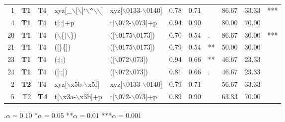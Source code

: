 \begin{table*}[ht]
\begin{tabular}{rr@{ -- }lllrrlrrl}
  1 & {\bf T1} & T4 & xyz[\_$\backslash$[$\backslash$]`$\backslash$\verb|^|$\backslash$$\backslash$] & xyz[$\backslash$0133-$\backslash$0140] & 0.78 & 0.71 &   & 86.67 & 33.33 & *** \\ 

  4 & {\bf T1} & T4 & t[:;]+p & t[$\backslash$072-$\backslash$073]+p & 0.94 & 0.90 &   & 80.00 & 70.00 &   \\ 
  
  20 & {\bf T1} & T4 & ($\backslash$\{$|$$\backslash$\}) & ([$\backslash$0175$\backslash$0173]) & 0.70 & 0.54 & . & 86.67 & 30.00 & *** \\ 
  21 & {\bf T1} & T4 & ([\}\{]) & ([$\backslash$0175$\backslash$0173]) & 0.79 & 0.54 & ** & 50.00 & 30.00 &   \\ 
  23 & {\bf T1} & T4 & (:$|$;) & ([$\backslash$072$\backslash$073]) & 0.94 & 0.66 & ** & 46.67 & 23.33 &   \\ 
  24 & {\bf T1} & T4 & ([:;]) & ([$\backslash$072$\backslash$073]) & 0.81 & 0.66 & . & 46.67 & 23.33 &   \\ 
  
  2 & {\bf T2} & T4 & xyz[$\backslash$x5b-$\backslash$x5f] & xyz[$\backslash$0133-$\backslash$0140] & 0.79 & 0.71 &   & 56.67 & 33.33 &   \\ 
  5 & T2 & {\bf T4} & t[$\backslash$x3a-$\backslash$x3b]+p & t[$\backslash$072-$\backslash$073]+p & 0.89 & 0.90 &   & 63.33 & 70.00 &   \\ 
   \hline
\end{tabular}

\vspace{3pt}
.$\alpha = 0.10$ \hspace{3pt} *$\alpha=0.05$ \hspace{3pt} **$\alpha=0.01$ \hspace{3pt} ***$\alpha=0.001$
\end{table*}
